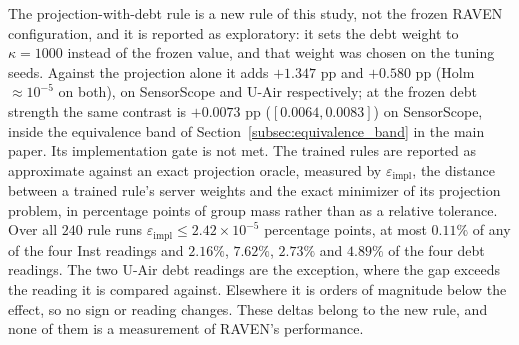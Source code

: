 \documentclass[letterpaper,journal]{IEEEtran}
\begin{document}
The projection-with-debt rule is a new rule of this study, not the frozen RAVEN
configuration, and it is reported as exploratory: it sets the debt weight to
$\kappa=1000$ instead of the frozen value, and that weight was chosen on the
tuning seeds.  Against the projection alone it adds $+1.347$ pp and $+0.580$ pp
(Holm $\approx10^{-5}$ on both), on SensorScope and U-Air respectively; at the
frozen debt strength the same contrast is $+0.0073$ pp ($[0.0064,0.0083]$) on
SensorScope, inside the equivalence band of
Section~\ref{subsec:equivalence_band} in the main paper.  Its implementation
gate is not met.  The trained rules are reported as approximate against an exact
projection oracle, measured by $\varepsilon_{\mathrm{impl}}$, the distance
between a trained rule's server weights and the exact minimizer of its
projection problem, in percentage points of group mass rather than as a
relative tolerance.  Over all $240$ rule runs
$\varepsilon_{\mathrm{impl}}\le2.42\times10^{-5}$ percentage points, at most
$0.11\%$ of any of the four Inst readings and $2.16\%$, $7.62\%$, $2.73\%$ and
$4.89\%$ of the four debt readings.  The two U-Air debt readings are the
exception, where the gap exceeds the reading it is compared against.  Elsewhere
it is orders of magnitude below the effect, so no sign or reading changes.
These deltas belong to the new rule, and none of them is a measurement of
RAVEN's performance.



\end{document}
